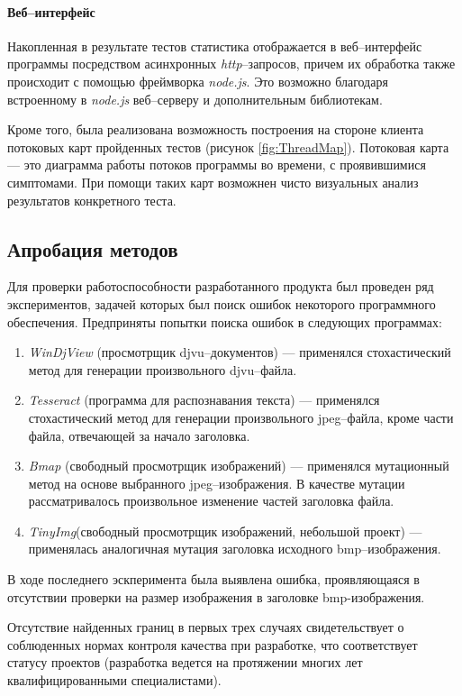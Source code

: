 \documentclass[a4paper,14pt,href]{article}
\begin{document}
\paragraph{Веб--интерфейс} Накопленная в результате тестов статистика отображается в веб--интерфейс программы посредством асинхронных \textit{http}--запросов, причем их обработка также происходит с помощью фреймворка \textit{node.js}. Это возможно благодаря встроенному в \textit{node.js} веб--серверу и дополнительным библиотекам\cite{expressjs}.
	
	Кроме того, была реализована возможность построения на стороне клиента потоковых карт пройденных тестов (рисунок \ref{fig:ThreadMap}). Потоковая карта --- это диаграмма работы потоков программы во времени, с проявившимися симптомами. При помощи таких карт возможнен чисто визуальных анализ результатов конкретного теста.
	
\subsection{Апробация методов} 
  Для проверки работоспособности разработанного продукта был проведен ряд экспериментов, задачей которых был поиск ошибок некоторого программного обеспечения. Предприняты попытки поиска ошибок в следующих программах:\begin{enumerate}
\item \textit{WinDjView}\cite{WinDjView} (просмотрщик djvu--документов) --- применялся стохастический метод для генерации произвольного djvu--файла.
\item \textit{Tesseract}\cite{Tesseract} (программа для распознавания текста) --- применялся стохастический метод для генерации произвольного jpeg--файла, кроме части файла, отвечающей за начало заголовка.
\item \textit{Bmap}\cite{Bmap} (свободный просмотрщик изображений) --- применялся мутационный метод на основе выбранного jpeg--изображения. В качестве мутации рассматривалось произвольное изменение частей заголовка файла.
\item \textit{TinyImg}\cite{TinyImg}(свободный просмотрщик изображений, небольшой проект) --- применялась аналогичная мутация заголовка исходного bmp--изоб\-ра\-жения. 
\end{enumerate}  

	В ходе последнего эскперимента была выявлена ошибка, проявляющаяся в отсутствии проверки на размер изображения в заголовке bmp-изображения. 

	Отсутствие найденных границ в первых трех случаях свидетельствует о соблюденных нормах контроля качества при разработке, что соответствует статусу проектов (разработка ведется на протяжении многих лет квалифицированными специалистами).
\newpage
\end{document}
